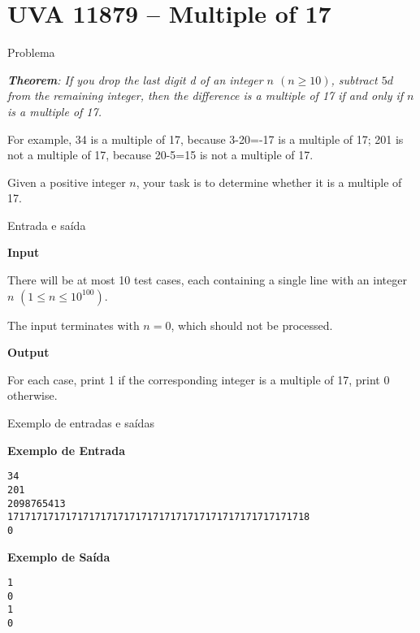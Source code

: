 \section{UVA 11879 -- Multiple of 17}

\begin{frame}[fragile]{Problema}

\begin{center}
\textit{\textbf{Theorem}: If you drop the last digit d of an integer $n$ $(n \geq 10)$, subtract $5d$ from the remaining integer, then the difference is a multiple of 17 if and only if $n$ is a multiple of 17.}
\end{center}

For example, 34 is a multiple of 17, because 3-20=-17 is a multiple of 17; 201 is not a multiple of
17, because 20-5=15 is not a multiple of 17.

Given a positive integer $n$, your task is to determine whether it is a multiple of 17.

\end{frame}

\begin{frame}[fragile]{Entrada e saída}

\textbf{Input}

There will be at most 10 test cases, each containing a single line with an integer $n$ $(1 \leq n \leq 10^{100})$.

The input terminates with $n = 0$, which should not be processed.

\vspace{0.1in}

\textbf{Output}

For each case, print 1 if the corresponding integer is a multiple of 17, print 0 otherwise.

\end{frame}

\begin{frame}[fragile]{Exemplo de entradas e saídas}

\textbf{Exemplo de Entrada}
\begin{verbatim}
34
201
2098765413
1717171717171717171717171717171717171717171717171718
0
\end{verbatim}

\textbf{Exemplo de Saída}
\begin{verbatim}
1
0
1
0
\end{verbatim}
\end{frame}

